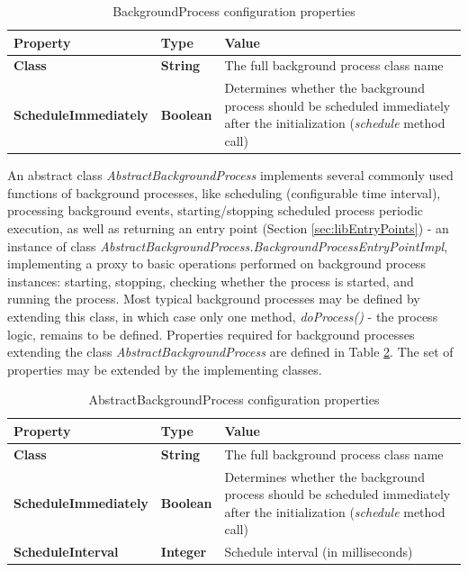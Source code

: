 \begin{table}
\scriptsize
\begin{center}
\begin{tabular}{p{3cm} p{3cm} p{8.5cm}}
	\hline
	\textbf{Property}						& \textbf{Type}					& \textbf{Value}					\\[1mm]
    \hline
	\textbf{Class}							& \textbf{String}				& The full background process class name		\\[1.5mm]
	\textbf{ScheduleImmediately}			& \textbf{Boolean}				& Determines whether the background process should be scheduled immediately after the initialization (\emph{schedule} method call)		\\[1.5mm]
    \hline
\end{tabular}
\end{center}
\caption{BackgroundProcess configuration properties}
\label{tab:libBackgroundProcess}
\end{table}

An abstract class \emph{AbstractBackgroundProcess} implements several commonly used functions of background processes, like scheduling (configurable time interval), processing background events, starting/stopping scheduled process periodic execution, as well as returning an entry point (Section \ref{sec:libEntryPoints}) - an instance of class \emph{AbstractBackgroundProcess.BackgroundProcessEntryPointImpl}, implementing a proxy to basic operations performed on background process instances: starting, stopping, checking whether the process is started, and running the process. Most typical background processes may be defined by extending this class, in which case only one method, \emph{doProcess()} - the process logic, remains to be defined. Properties required for background processes extending the class \emph{AbstractBackgroundProcess} are defined in Table \ref{tab:libAbstractBackgroundProcess}. The set of properties may be extended by the implementing classes.

\begin{table}
\scriptsize
\begin{center}
\begin{tabular}{p{3cm} p{3cm} p{8.5cm}}
	\hline
	\textbf{Property}						& \textbf{Type}					& \textbf{Value}					\\[1mm]
    \hline
	\textbf{Class}							& \textbf{String}				& The full background process class name		\\[1.5mm]
	\textbf{ScheduleImmediately}			& \textbf{Boolean}				& Determines whether the background process should be scheduled immediately after the initialization (\emph{schedule} method call)		\\[1.5mm]
	\textbf{ScheduleInterval}				& \textbf{Integer}				& Schedule interval (in milliseconds) 			\\[1.5mm]
    \hline
\end{tabular}
\end{center}
\caption{AbstractBackgroundProcess configuration properties}
\label{tab:libAbstractBackgroundProcess}
\end{table}








